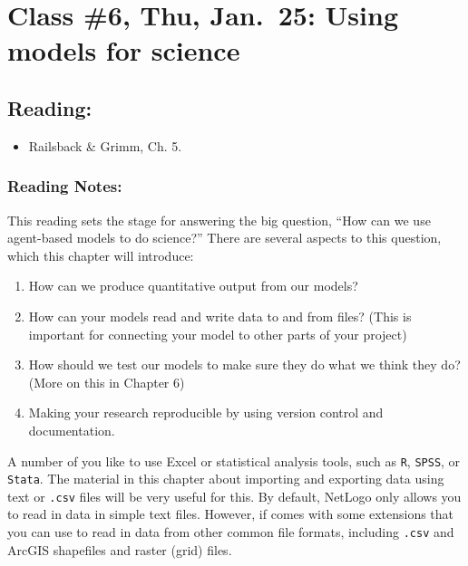 \documentclass[]{article}
\providecommand{\tightlist}{%
  \setlength{\itemsep}{0pt}\setlength{\parskip}{0pt}}
\begin{document}
\hypertarget{class-6-thu-jan.25-using-models-for-science}{%
\section{Class \#6, Thu, Jan.~25: Using models for
science}\label{class-6-thu-jan.25-using-models-for-science}}

\hypertarget{reading-5}{%
\subsection{Reading:}\label{reading-5}}

\begin{itemize}
\tightlist
\item
  Railsback \& Grimm, Ch. 5.
\end{itemize}

\hypertarget{reading-notes-4}{%
\subsubsection{Reading Notes:}\label{reading-notes-4}}

This reading sets the stage for answering the big question, ``How can we
use agent-based models to do science?'' There are several aspects to
this question, which this chapter will introduce:

\begin{enumerate}
\def\labelenumi{\arabic{enumi}.}
\tightlist
\item
  How can we produce quantitative output from our models?
\item
  How can your models read and write data to and from files? (This is
  important for connecting your model to other parts of your project)
\item
  How should we test our models to make sure they do what we think they
  do? (More on this in Chapter 6)
\item
  Making your research reproducible by using version control and
  documentation.
\end{enumerate}

A number of you like to use Excel or statistical analysis tools, such as
\texttt{R}, \texttt{SPSS}, or \texttt{Stata}. The material in this
chapter about importing and exporting data using text or \texttt{.csv}
files will be very useful for this. By default, NetLogo only allows you
to read in data in simple text files. However, if comes with some
extensions that you can use to read in data from other common file
formats, including \texttt{.csv} and ArcGIS shapefiles and raster (grid)
files.
\end{document}
